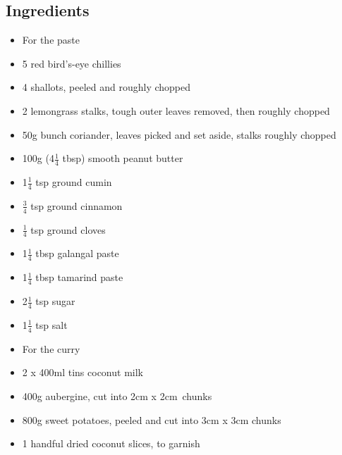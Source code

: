 \documentclass{book}
\begin{document}
\subsection*{Ingredients}
\begin{itemize}
\item For the paste
\item 5 red bird’s-eye chillies
\item 4 shallots, peeled and roughly chopped
\item 2 lemongrass stalks, tough outer leaves removed, then roughly chopped
\item 50g bunch coriander, leaves picked and set aside, stalks roughly chopped
\item 100g (4$\frac{1}{4}$ tbsp) smooth peanut butter 
\item 1$\frac{1}{4}$ tsp ground cumin
\item $\frac{3}{4}$ tsp ground cinnamon
\item $\frac{1}{4}$ tsp ground cloves
\item 1$\frac{1}{4}$ tbsp galangal paste
\item 1$\frac{1}{4}$ tbsp tamarind paste
\item 2$\frac{1}{4}$ tsp sugar 
\item 1$\frac{1}{4}$ tsp salt
\end{itemize}

\begin{itemize}
\item For the curry 
\item 2 x 400ml tins coconut milk
\item 400g aubergine, cut into 2cm x 2cm chunks
\item 800g sweet potatoes, peeled and cut into 3cm x 3cm chunks
\item 1 handful dried coconut slices, to garnish 
\end{itemize}
\end{document}
